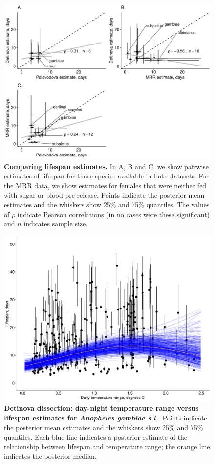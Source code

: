 \documentclass[12pt]{article}
\begin{document}
\begin{figure}[h]
	\centerline{\includegraphics[width=1.3\textwidth]{./Figure_files/pairwise_comparison.pdf}}
	\caption{\textbf{Comparing lifespan estimates.} In A, B and C, we show pairwise estimates of lifespan for those species available in both datasets. For the MRR data, we show estimates for females that were neither fed with sugar or blood pre-release. Points indicate the posterior mean estimates and the whiskers show 25\% and 75\% quantiles. The values of $\rho$ indicate Pearson correlations (in no cases were these significant) and $n$ indicates sample size.}
	\label{fig:comparison}
\end{figure}

\begin{figure}[h]
	\centerline{\includegraphics[width=1.3\textwidth]{./Figure_files/detinova_gambiae_temp_range_lifespan.pdf}}
	\caption{\textbf{Detinova dissection: day-night temperature range versus lifespan estimates for \textit{Anopheles gambiae s.l.}.} Points indicate the posterior mean estimates and the whiskers show 25\% and 75\% quantiles. Each blue line indicates a posterior estimate of the relationship between lifespan and temperature range; the orange line indicates the posterior median.}
	\label{fig:detinova_gambiae_daynight_range_lifespan_country}
\end{figure}
\end{document}

